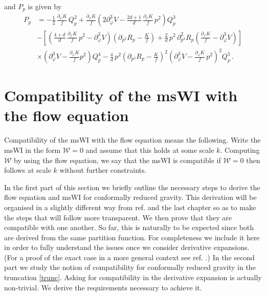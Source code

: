 \documentclass[11pt]{book} %
\numberwithin{equation}{chapter}
\begin{document}
and $P_p$ is given by
\begin{align}
	P_p &= - \frac{1}{2} \, \frac{\partial_\varphi K}{f} \, Q_p^2
	+ \frac{\partial_\varphi K}{f}
  \left(
    2 \partial_\varphi^3 V
    - \frac{2d+1}{d} \, \frac{\partial_{\varphi}K}{f} \, p^2
  \right) Q_p^3 \nonumber \\
  & -
  \left[
    \left(
      \frac{4+d}{d} \, \frac{\partial_\varphi K}{f} \, p^2
      - \partial^3_\varphi V
    \right)
    \left(
      \partial_{p^2} R_p - \frac{K}{f}
    \right)
    + \frac{2}{d} \, p^2 \, \partial^2_{p^2} R_p
    \left(
      \frac{\partial_\varphi K}{f} - \partial_\varphi^3 V
    \right)
  \right] \nonumber \\
  & \times \left(\partial_\varphi^3 V - \frac{\partial_\varphi K}{f}p^2\right)Q_p^4
  -\frac{4}{d} \, p^2
  \left(
    \partial_{p^2}R_p-\frac{K}{f}
  \right)^2
  \left(
    \partial_\varphi^3 V - \frac{\partial_\varphi K}{f} \, p^2
  \right)^2 Q_p^5 \,.
\end{align}

\section{Compatibility of the msWI with the flow equation}

Compatibility of the msWI with the flow equation means the following.
Write the msWI in the form $\mathcal{W}=0$ and assume that this holds at some scale $k$.
Computing $\dot{\mathcal{W}}$ by using the flow equation,
we say that the msWI is compatible if $\dot{\mathcal{W}}=0$ then follows at scale $k$ without further
constraints.

In the first part of this section we briefly outline the necessary steps to derive the flow equation
and msWI for conformally reduced gravity.
This derivation will be organised in a slightly different way from ref. \cite{Dietz:2015owa}
and the last chapter so as to make the steps that will follow more transparent.
We then prove that they are compatible with one another.
So far, this is naturally to be expected since both are derived from the same partition function.
For completeness we include it here in order to fully understand the issues once we consider derivative
expansions. (For a proof of the exact case in a more general context see ref. \cite{Safari:2015dva}.)
In the second part we study the notion of compatibility for conformally reduced gravity in the
truncation \eqref{trunc}. Asking for compatibility in the derivative expansion is actually non-trivial.
We derive the requirements necessary to achieve it.
\end{document}
